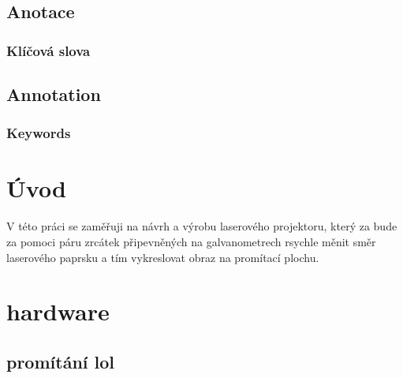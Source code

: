 \documentclass{template/socthesis}
\author{Šimon Hrouda}
\begin{document}
\maketitle



\pagestyle{empty}

\section*{Anotace}


\subsection*{Klíčová slova}


\vspace{20mm}

\section*{Annotation}


\subsection*{Keywords}


\newpage
\pagestyle{plain}

\tableofcontents %

\setcounter{figure}{0}
\setcounter{table}{0}
\newpage

\chapter*{Úvod}
V této práci se zaměřuji na návrh a výrobu laserového projektoru, který za bude za pomoci páru zrcátek připevněných na galvanometrech rsychle měnit směr laserového paprsku a tím vykreslovat obraz na promítací plochu.


\newpage
\chapter{hardware}
\section{promítání lol}
\end{document}
